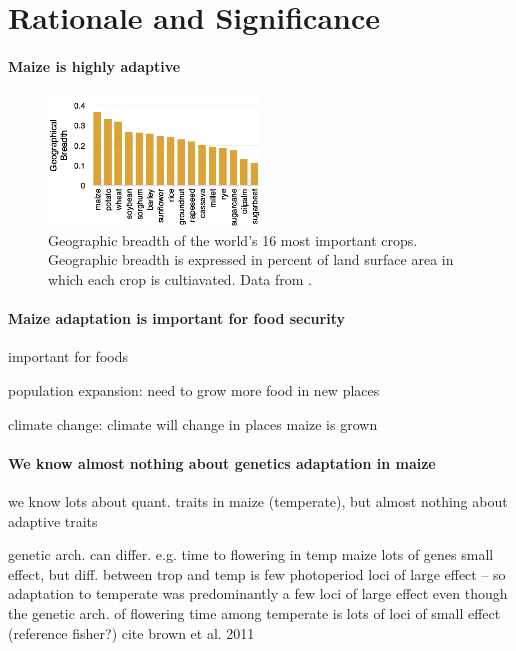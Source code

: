 \section*{Rationale and Significance}

\paragraph*{Maize is highly adaptive}

\begin{figure}
  \centering
  \caption{Geographic breadth of the world's 16 most important crops. Geographic breadth is expressed in percent of land surface area in which each crop is cultiavated. Data from \citet{Ramankutty2008}. } 
   \includegraphics[width=0.5\textwidth]{breadth.png}

\label{fig:breadth}
\end{figure}


\paragraph*{Maize adaptation is important for food security}

important for foods

population expansion: need to grow more food in new places

climate change: climate will change in places maize is grown

\paragraph*{We know almost nothing about genetics adaptation in maize}

we know lots about quant. traits in maize (temperate), but almost nothing about adaptive traits

genetic arch. can differ. e.g. time to flowering in temp maize lots of genes small effect, but diff. between trop and temp is few photoperiod loci of large effect -- so adaptation to temperate was predominantly a few loci of large effect even though the genetic arch. of flowering time among temperate is lots of loci of small effect (reference fisher?) cite brown et al. 2011

